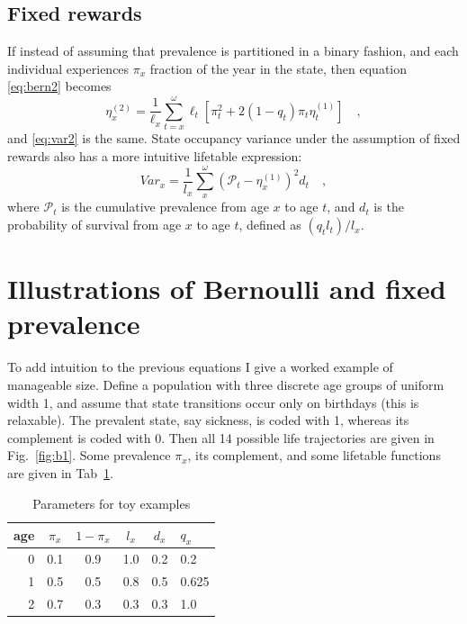 \documentclass{bmcart}
\begin{document}
\subsection*{Fixed rewards}
If instead of assuming that prevalence is partitioned in a binary fashion, and each individual experiences $\pi_x$ fraction of the year in the state, then equation \eqref{eq:bern2} becomes
\begin{equation}
\eta^{(2)}_x = \frac{1}{\ell_x} \sum_{t=x}^\omega \ell_t\left[\pi_t^2 + 2(1-q_t)\pi_t\eta^{(1)}_t\right] \quad \mathrm{,}
\end{equation}
and \eqref{eq:var2} is the same. State occupancy variance under the assumption of fixed rewards also has a more intuitive lifetable expression:
\begin{equation}
\label{eq:varfixed2}
Var_x = \frac{1}{l_x}\sum_x^\omega (\mathcal{P}_t - \eta^{(1)}_x)^2 d_t \quad\mathrm{,}
\end{equation}
where $\mathcal{P}_t$ is the cumulative prevalence from age $x$ to age $t$, and $d_t$ is the probability of survival from age $x$ to age $t$, defined as $(q_t l_t)/l_x$. 
\section{Illustrations of Bernoulli and fixed prevalence}
To add intuition to the previous equations I give a worked example of manageable size. Define a population with three discrete age groups of uniform width 1, and assume that state transitions occur only on birthdays (this is relaxable). The prevalent state, say sickness, is coded with 1, whereas its complement is coded with 0. Then all 14 possible life trajectories are given in Fig.~\ref{fig:b1}. Some prevalence $\pi_x$, its complement, and some lifetable functions are given in Tab~\ref{tab:toy}.

\begin{table}[ht!]
\begin{tabular}{r|ccccl}
age & $\pi_x$ & $1-\pi_x$ & $l_x$ & $d_x$ & $q_x$\\
\hline
0 & 0.1 & 0.9 & 1.0 & 0.2 & 0.2   \\
1 & 0.5 & 0.5 & 0.8 & 0.5 & 0.625 \\
2 & 0.7 & 0.3 & 0.3 & 0.3 & 1.0  
\end{tabular}
\caption{Parameters for toy examples}
\label{tab:toy}
\end{table}
\end{document}
